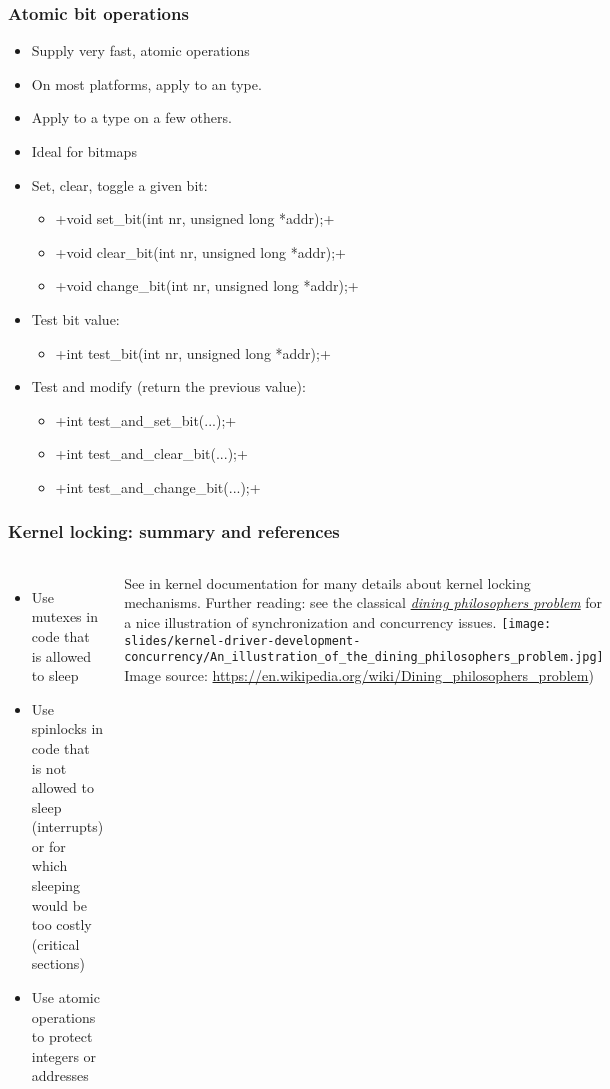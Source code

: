 \begin{frame}[fragile]
  \frametitle{Atomic bit operations}
  \begin{itemize}
  \item Supply very fast, atomic operations
  \item On most platforms, apply to an  type.
  \item Apply to a  type on a few others.
  \item Ideal for bitmaps
  \item Set, clear, toggle a given bit:
    \begin{itemize}
    \item {}+void set_bit(int nr, unsigned long *addr);+
    \item {}+void clear_bit(int nr, unsigned long *addr);+
    \item {}+void change_bit(int nr, unsigned long *addr);+
    \end{itemize}
  \item Test bit value:
    \begin{itemize}
    \item {}+int test_bit(int nr, unsigned long *addr);+
    \end{itemize}
  \item Test and modify (return the previous value):
    \begin{itemize}
    \item {}+int test_and_set_bit(...);+
    \item {}+int test_and_clear_bit(...);+
    \item {}+int test_and_change_bit(...);+
    \end{itemize}
  \end{itemize}
\end{frame}

\begin{frame}
  \frametitle{Kernel locking: summary and references}
  \begin{columns}
    \begin{itemize}
    \item Use mutexes in code that is allowed to sleep
    \item Use spinlocks in code that is not allowed to sleep (interrupts)
      or for which sleeping would be too costly (critical sections)
    \item Use atomic operations to protect integers or addresses
    \end{itemize}
    See  in kernel documentation
    for many details about kernel locking mechanisms.
    \footnotesize
    Further reading: see the classical
    {\em \href{https://en.wikipedia.org/wiki/Dining_philosophers_problem}
    {dining philosophers problem}} for a nice illustration of synchronization
    and concurrency issues.
    \texttt{[image: slides/kernel-driver-development-concurrency/An\_illustration\_of\_the\_dining\_philosophers\_problem.jpg]}
    \tiny Image source: \url{https://en.wikipedia.org/wiki/Dining_philosophers_problem})
  \end{columns}
\end{frame}

